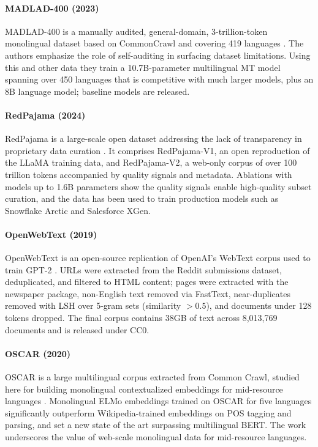 \documentclass[letterpaper]{article}
\begin{document}
\paragraph{MADLAD-400 (2023)} MADLAD-400 is a manually audited, general-domain, 3-trillion-token monolingual dataset based on CommonCrawl and covering 419 languages \citep{kudugunta2023madlad400multilingualdocumentlevellarge}. The authors emphasize the role of self-auditing in surfacing dataset limitations. Using this and other data they train a 10.7B-parameter multilingual MT model spanning over 450 languages that is competitive with much larger models, plus an 8B language model; baseline models are released.

\paragraph{RedPajama (2024)} RedPajama is a large-scale open dataset addressing the lack of transparency in proprietary data curation \citep{weber2024redpajamaopendatasettraining}. It comprises RedPajama-V1, an open reproduction of the LLaMA training data, and RedPajama-V2, a web-only corpus of over 100 trillion tokens accompanied by quality signals and metadata. Ablations with models up to 1.6B parameters show the quality signals enable high-quality subset curation, and the data has been used to train production models such as Snowflake Arctic and Salesforce XGen.

\paragraph{OpenWebText (2019)} OpenWebText is an open-source replication of OpenAI's WebText corpus used to train GPT-2 \citep{Gokaslan2019OpenWeb}. URLs were extracted from the Reddit submissions dataset, deduplicated, and filtered to HTML content; pages were extracted with the newspaper package, non-English text removed via FastText, near-duplicates removed with LSH over 5-gram sets (similarity $>0.5$), and documents under 128 tokens dropped. The final corpus contains 38GB of text across 8,013,769 documents and is released under CC0.

\paragraph{OSCAR (2020)} OSCAR is a large multilingual corpus extracted from Common Crawl, studied here for building monolingual contextualized embeddings for mid-resource languages \citep{ortiz-suarez-etal-2020-monolingual}. Monolingual ELMo embeddings trained on OSCAR for five languages significantly outperform Wikipedia-trained embeddings on POS tagging and parsing, and set a new state of the art surpassing multilingual BERT. The work underscores the value of web-scale monolingual data for mid-resource languages.
\end{document}
